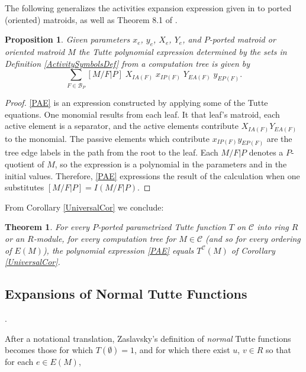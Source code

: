 \documentclass[12pt,leqno]{amsart}
\newtheorem{prop}[lem]{Proposition}
\newtheorem{thm}[lem]{Theorem}
\theoremstyle{remark}
\begin{document}

The following generalizes the activities expansion expression given
in \cite{MR93a:05047} to ported (oriented) matroids, as well as 
Theorem 8.1 of \cite{SetPointedLV}. 

\begin{prop}
\label{TuttePolyExpression}
Given parameters $x_e$, $y_e$, $X_e$, $Y_e$, and 
$P$-ported matroid or oriented matroid $M$
the Tutte polynomial expression
determined by the sets in Definition 
\ref{ActivitySymbolsDef} 
from a computation tree is 
given by
\begin{equation}
\tag{PAE}
\label{PAE}
\sum_{F\in \mathcal{B}_P}[M/F|P]
\;X_{IA(F)}\;x_{IP(F)}\;Y_{EA(F)}\;y_{EP(F)}.
\end{equation}
\end{prop}

\begin{proof}
\eqref{PAE} is an expression constructed by applying some of the
Tutte equations.  One monomial results from each leaf.
It that leaf's matroid,
each active element is a separator, and the active elements
contribute $X_{IA(F)}Y_{EA(F)}$ to the monomial.
The passive elements which contribute
$x_{IP(F)}y_{EP(F)}$
are the tree
edge labels in the path from the root to the leaf.
Each $M/F|P$ denotes a $P$-quotient of $M$, so the
expression is a polynomial in the parameters and in the
initial values.  
Therefore, \eqref{PAE} expressions the result of
the calculation when one substitutes
$[M/F|P]=I(M/F|P)$.
\end{proof}

From Corollary \ref{UniversalCor} we conclude:
\begin{thm}
\label{ActivitiesTheorem}
For every $P$-ported parametrized Tutte function $T$ 
on $\mathcal{C}$ into 
ring $R$ or an $R$-module,
for every computation tree for $M\in\mathcal{C}$
(and so for every ordering of $E(M)$), 
the polynomial expression \eqref{PAE} equals 
$T^{\mathcal{C}}(M)$ of Corollary \ref{UniversalCor}.
\end{thm}

\subsection{Expansions of Normal Tutte Functions}
\label{NormalSubSec}.

After a notational translation, 
Zaslavsky's \cite{MR93a:05047} definition of \emph{normal} Tutte 
functions becomes
those for which $T(\emptyset)=1$, and for which there exist
$u$, $v\in R$ so that for each $e\in E(M)$,
\end{document}
